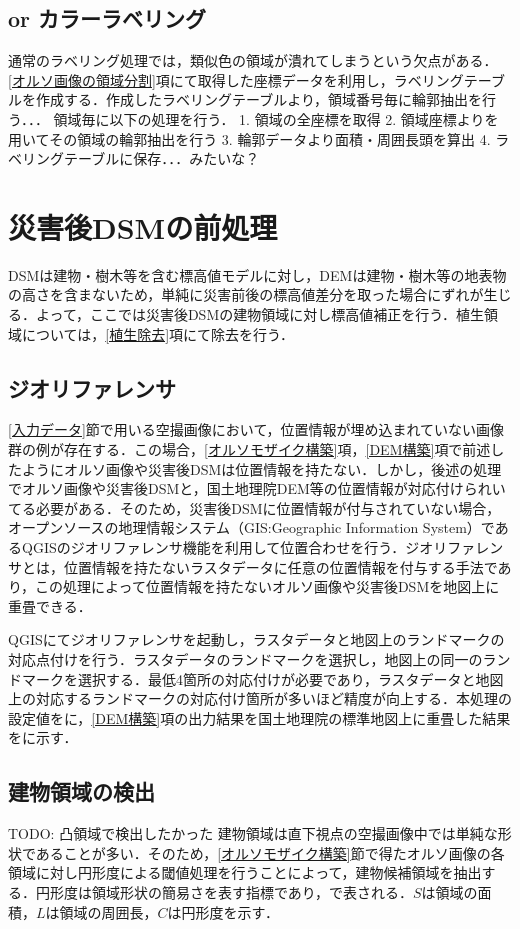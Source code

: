     \subsection{or カラーラベリング}
      通常のラベリング処理では，類似色の領域が潰れてしまうという欠点がある．
      \ref{オルソ画像の領域分割}項にて取得した座標データを利用し，ラベリングテーブルを作成する．作成したラベリングテーブルより，領域番号毎に輪郭抽出を行う．．．
      領域毎に以下の処理を行う．
        1. 領域の全座標を取得
        2. 領域座標よりを用いてその領域の輪郭抽出を行う
        3. 輪郭データより面積・周囲長頭を算出
        4. ラベリングテーブルに保存．．．みたいな？
      


  \section{災害後DSMの前処理}
    DSMは建物・樹木等を含む標高値モデルに対し，DEMは建物・樹木等の地表物の高さを含まないため，単純に災害前後の標高値差分を取った場合にずれが生じる．よって，ここでは災害後DSMの建物領域に対し標高値補正を行う．植生領域については，\ref{植生除去}項にて除去を行う．

    \subsection{ジオリファレンサ}
      \ref{入力データ}節で用いる空撮画像において，位置情報が埋め込まれていない画像群の例が存在する．この場合，\ref{オルソモザイク構築}項，\ref{DEM構築}項で前述したようにオルソ画像や災害後DSMは位置情報を持たない．しかし，後述の処理でオルソ画像や災害後DSMと，国土地理院DEM等の位置情報が対応付けられいてる必要がある．そのため，災害後DSMに位置情報が付与されていない場合，オープンソースの地理情報システム（GIS:Geographic Information System）であるQGIS\cite{QGIS}のジオリファレンサ機能を利用して位置合わせを行う．ジオリファレンサとは，位置情報を持たないラスタデータに任意の位置情報を付与する手法であり，この処理によって位置情報を持たないオルソ画像や災害後DSMを地図上に重畳できる．

      QGISにてジオリファレンサを起動し，ラスタデータと地図上のランドマークの対応点付けを行う．ラスタデータのランドマークを選択し，地図上の同一のランドマークを選択する．最低4箇所の対応付けが必要であり，ラスタデータと地図上の対応するランドマークの対応付け箇所が多いほど精度が向上する．本処理の設定値を\fref{}に，\ref{DEM構築}項の出力結果を国土地理院の標準地図\cite{標準地図}上に重畳した結果を\fref{}に示す．

    \subsection{建物領域の検出}
      \label{建物領域の検出}
      TODO: 凸領域で検出したかった
      建物領域は直下視点の空撮画像中では単純な形状であることが多い．そのため，\ref{オルソモザイク構築}節で得たオルソ画像の各領域に対し円形度による閾値処理を行うことによって，建物候補領域を抽出する．円形度は領域形状の簡易さを表す指標であり，で表される．$S$は領域の面積，$L$は領域の周囲長，$C$は円形度を示す．

